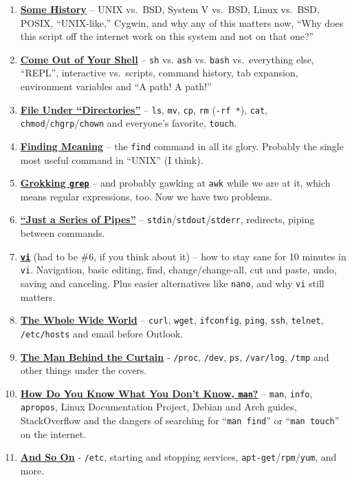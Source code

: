\documentclass[10pt,]{book}
\numberwithin{figure}{chapter}
\begin{document}
\begin{enumerate}
\def\labelenumi{\arabic{enumi}.}
\setcounter{enumi}{-1}
\item
  \hyperref[some-history]{\textbf{Some History}} -- UNIX vs.~BSD, System
  V vs.~BSD, Linux vs.~BSD, POSIX, ``UNIX-like,'' Cygwin, and why any of
  this matters now, ``Why does this script off the internet work on this
  system and not on that one?''
\item
  \hyperref[come-out-of-your-shell]{\textbf{Come Out of Your Shell}} --
  \texttt{sh} vs. \texttt{ash} vs. \texttt{bash} vs.~everything else,
  ``REPL'', interactive vs.~scripts, command history, tab expansion,
  environment variables and ``A path! A path!''
\item
  \hyperref[file-under-directories]{\textbf{File Under ``Directories''}}
  -- \texttt{ls}, \texttt{mv}, \texttt{cp}, \texttt{rm}
  (\texttt{-rf *}), \texttt{cat},
  \texttt{chmod}/\texttt{chgrp}/\texttt{chown} and everyone's favorite,
  \texttt{touch}.
\item
  \hyperref[finding-meaning]{\textbf{Finding Meaning}} -- the
  \texttt{find} command in all its glory. Probably the single most
  useful command in ``UNIX'' (I think).
\item
  \hyperref[grokking-grep]{\textbf{Grokking \texttt{grep}}} -- and
  probably gawking at \texttt{awk} while we are at it, which means
  regular expressions, too. Now we have two problems.
\item
  \hyperref[just-a-series-of-pipes]{\textbf{``Just a Series of Pipes''}}
  -- \texttt{stdin}/\texttt{stdout}/\texttt{stderr}, redirects, piping
  between commands.
\item
  \hyperref[vi]{\textbf{\texttt{vi}}} (had to be \#6, if you think about
  it) -- how to stay sane for 10 minutes in \texttt{vi}. Navigation,
  basic editing, find, change/change-all, cut and paste, undo, saving
  and canceling. Plus easier alternatives like \texttt{nano}, and why
  \texttt{vi} still matters.
\item
  \hyperref[the-whole-wide-world]{\textbf{The Whole Wide World}} --
  \texttt{curl}, \texttt{wget}, \texttt{ifconfig}, \texttt{ping},
  \texttt{ssh}, \texttt{telnet}, \texttt{/etc/hosts} and email before
  Outlook.
\item
  \hyperref[the-man-behind-the-curtain]{\textbf{The Man Behind the
  Curtain}} - \texttt{/proc}, \texttt{/dev}, \texttt{ps},
  \texttt{/var/log}, \texttt{/tmp} and other things under the covers.
\item
  \hyperref[how-do-you-know-what-you-dont-know-man]{\textbf{How Do You
  Know What You Don't Know, \texttt{man}?}} -- \texttt{man},
  \texttt{info}, \texttt{apropos}, Linux Documentation Project, Debian
  and Arch guides, StackOverflow and the dangers of searching for
  ``\texttt{man find}'' or ``\texttt{man touch}'' on the internet.
\item
  \hyperref[and-so-on]{\textbf{And So On}} - \texttt{/etc}, starting and
  stopping services, \texttt{apt-get}/\texttt{rpm}/\texttt{yum}, and
  more.
\end{enumerate}
\end{document}
